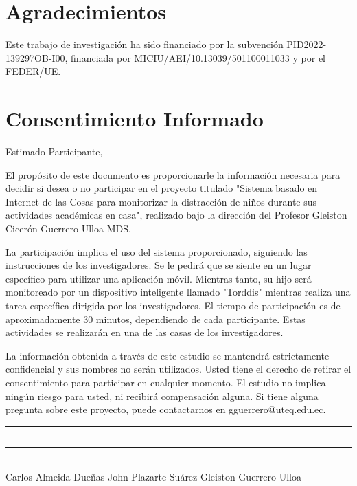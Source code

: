 \documentclass[a4paper,fleqn]{cas-sc}
\begin{document}
	\section*{Agradecimientos}
	
	Este trabajo de investigación ha sido financiado por la subvención PID2022-139297OB-I00, financiada por MICIU/AEI/10.13039/501100011033 y por el FEDER/UE.
	
	\printcredits
	
	
	
	
	
	\clearpage
	
	\appendix
	\section{Consentimiento Informado} \label{Appendix:InformedConsent}
	Estimado Participante,
	
	El propósito de este documento es proporcionarle la información necesaria para decidir si desea o no participar en el proyecto titulado "Sistema basado en Internet de las Cosas para monitorizar la distracción de niños durante sus actividades académicas en casa", realizado bajo la dirección del Profesor Gleiston Cicerón Guerrero Ulloa MDS.
	
	La participación implica el uso del sistema proporcionado, siguiendo las instrucciones de los investigadores. Se le pedirá que se siente en un lugar específico para utilizar una aplicación móvil. Mientras tanto, su hijo será monitoreado por un dispositivo inteligente llamado "Torddis" mientras realiza una tarea específica dirigida por los investigadores. El tiempo de participación es de aproximadamente 30 minutos, dependiendo de cada participante. Estas actividades se realizarán en una de las casas de los investigadores.
	
	La información obtenida a través de este estudio se mantendrá estrictamente confidencial y sus nombres no serán utilizados. Usted tiene el derecho de retirar el consentimiento para participar en cualquier momento. El estudio no implica ningún riesgo para usted, ni recibirá compensación alguna. Si tiene alguna pregunta sobre este proyecto, puede contactarnos en gguerrero@uteq.edu.ec.
	
	\vspace{0.5cm}
	\noindent\rule{3.65cm}{0.4pt} \hspace{1.1cm} \rule{4cm}{0.4pt} \hspace{1.1cm} \rule{4.2cm}{0.4pt}\\
	Carlos Almeida-Dueñas \hspace{2cm} John Plazarte-Suárez \hspace{2cm} Gleiston Guerrero-Ulloa
	
\end{document}
